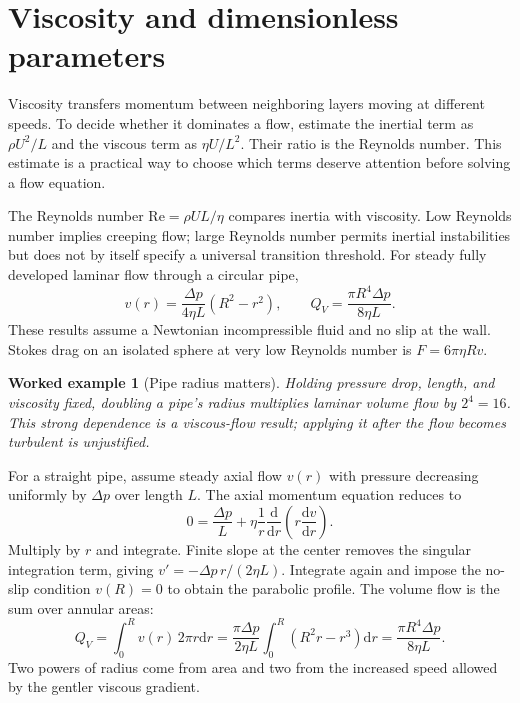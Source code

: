 \documentclass[11pt,oneside]{book}
\newcommand{\dd}{\mathrm{d}}
\newcommand{\od}[2]{\frac{\dd #1}{\dd #2}}
\theoremstyle{reviewstyle}
\newtheorem{example}{Worked example}[chapter]
\begin{document}
\section{Viscosity and dimensionless parameters}
Viscosity transfers momentum between neighboring layers moving at different speeds. To decide whether it dominates a flow, estimate the inertial term as $\rho U^2/L$ and the viscous term as $\eta U/L^2$. Their ratio is the Reynolds number. This estimate is a practical way to choose which terms deserve attention before solving a flow equation.

The Reynolds number $\mathrm{Re}=\rho UL/\eta$ compares inertia with viscosity. Low Reynolds number implies creeping flow; large Reynolds number permits inertial instabilities but does not by itself specify a universal transition threshold. For steady fully developed laminar flow through a circular pipe,
\begin{equation}
v(r)=\frac{\Delta p}{4\eta L}(R^2-r^2),\qquad
Q_V=\frac{\pi R^4\Delta p}{8\eta L}.
\end{equation}
These results assume a Newtonian incompressible fluid and no slip at the wall. Stokes drag on an isolated sphere at very low Reynolds number is $F=6\pi\eta Rv$.
\begin{example}[Pipe radius matters]
Holding pressure drop, length, and viscosity fixed, doubling a pipe's radius multiplies laminar volume flow by $2^4=16$. This strong dependence is a viscous-flow result; applying it after the flow becomes turbulent is unjustified.
\end{example}

For a straight pipe, assume steady axial flow $v(r)$ with pressure decreasing uniformly by $\Delta p$ over length $L$. The axial momentum equation reduces to
\begin{equation}
0=\frac{\Delta p}{L}+\eta\frac1r\od{}{r}\left(r\od vr\right).
\end{equation}
Multiply by $r$ and integrate. Finite slope at the center removes the singular integration term, giving $v'=-\Delta p\,r/(2\eta L)$. Integrate again and impose the no-slip condition $v(R)=0$ to obtain the parabolic profile. The volume flow is the sum over annular areas:
\begin{equation}
Q_V=\int_0^Rv(r)\,2\pi r\dd r
=\frac{\pi\Delta p}{2\eta L}\int_0^R(R^2r-r^3)\dd r
=\frac{\pi R^4\Delta p}{8\eta L}.
\end{equation}
Two powers of radius come from area and two from the increased speed allowed by the gentler viscous gradient.
\end{document}
